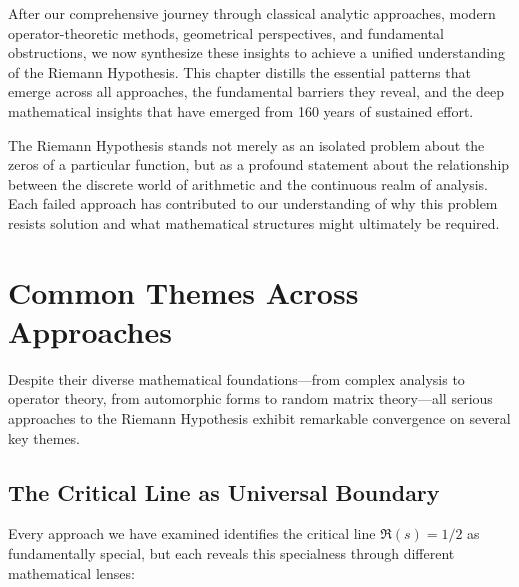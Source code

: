 \label{ch:unified}

After our comprehensive journey through classical analytic approaches, modern operator-theoretic methods, geometrical perspectives, and fundamental obstructions, we now synthesize these insights to achieve a unified understanding of the Riemann Hypothesis. This chapter distills the essential patterns that emerge across all approaches, the fundamental barriers they reveal, and the deep mathematical insights that have emerged from 160 years of sustained effort.

The Riemann Hypothesis stands not merely as an isolated problem about the zeros of a particular function, but as a profound statement about the relationship between the discrete world of arithmetic and the continuous realm of analysis. Each failed approach has contributed to our understanding of why this problem resists solution and what mathematical structures might ultimately be required.

\section{Common Themes Across Approaches}
\label{sec:common_themes}

Despite their diverse mathematical foundations—from complex analysis to operator theory, from automorphic forms to random matrix theory—all serious approaches to the Riemann Hypothesis exhibit remarkable convergence on several key themes.

\subsection{The Critical Line as Universal Boundary}
\label{subsec:critical_boundary}

Every approach we have examined identifies the critical line $\Re(s) = 1/2$ as fundamentally special, but each reveals this specialness through different mathematical lenses:

